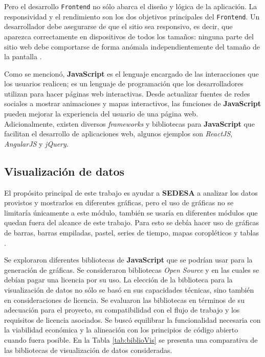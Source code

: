 Pero el desarrollo \texttt{Frontend} no sólo abarca el diseño y lógica de la aplicación. La responsividad y el rendimiento son los dos objetivos principales del \texttt{Frontend}. Un desarrollador debe asegurarse de que el sitio sea responsivo, es decir, que aparezca correctamente en dispositivos de todos los tamaños: ninguna parte del sitio web debe comportarse de forma anómala independientemente del tamaño de la pantalla \cite{wieruch2018road}.

Como se mencionó, \textbf{JavaScript} es el lenguaje encargado de las interacciones que los usuarios realicen; es un lenguaje de programación que los desarrolladores utilizan para hacer páginas web interactivas. Desde actualizar fuentes de redes sociales a mostrar animaciones y mapas interactivos, las funciones de \textbf{JavaScript} pueden mejorar la experiencia del usuario de una página web.\\
Adicionalmente, existen diversos \textit{frameworks} y bibliotecas para \textbf{JavaScript} que facilitan el desarrollo de aplicaciones web, algunos ejemplos son \textit{ReactJS}, \textit{AngularJS} y \textit{jQuery}.

\subsection{Visualización de datos}

El propósito principal de este trabajo es ayudar a \textbf{SEDESA} a analizar los datos provistos y mostrarlos en diferentes gráficas, pero el uso de gráficas no se limitaría únicamente a este módulo, también se usaría en diferentes módulos que quedan fuera del alcance de este trabajo. Para esto se debía hacer uso de gráficas de barras, barras empiladas, pastel, series de tiempo, mapas coropléticos y tablas \cite{grant2018data} \cite{hinderman2016building} \cite{kirk2016data}.

Se exploraron diferentes bibliotecas de \textbf{JavaScript} que se podrían usar para la generación de gráficas. Se consideraron bibliotecas \textit{Open Source} y en las cuales se debían pagar una licencia por su uso.
La elección de la biblioteca para la visualización de datos no sólo se basó en sus capacidades técnicas, sino también en consideraciones de licencia. Se evaluaron las bibliotecas en términos de su adecuación para el proyecto, su compatibilidad con el flujo de trabajo y los requisitos de licencia asociados. Se buscó equilibrar la funcionalidad necesaria con la viabilidad económica y la alineación con los principios de código abierto cuando fuera posible.
En la Tabla \ref{tab:biblioVis} se presenta una comparativa de las bibliotecas de visualización de datos consideradas.

